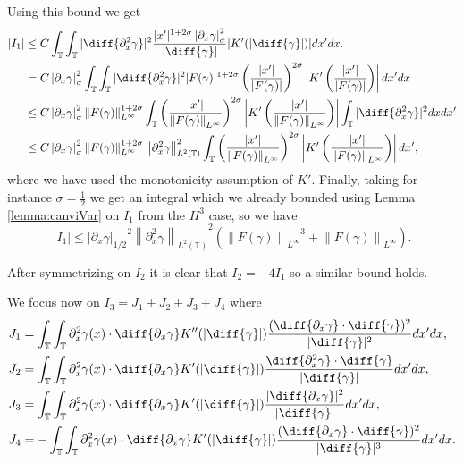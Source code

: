 \documentclass[a4paper]{amsart}
\theoremstyle{definition}
\newcommand{\T}{\ensuremath{\mathbb{T}}}
\newcommand{\SNa}[2][\gamma]{\ensuremath{\left|#2\right|_{#1}}}
\newcommand{\Np}[2][\infty]{\ensuremath{\left\|#2\right\|_{L^#1}}}
\newcommand{\Lp}[2][2]{\ensuremath{\left\|#2\right\|_{L^#1(\T)}}}
\newcommand{\intTT}{\ensuremath{\int_\T\int_\T}}
\begin{document}
    Using this bound we get 
    \begin{align*}
        |I_1|&\leq C \intTT |\diff{\partial_x^2\gamma}|^2 \frac{|x'|^{1+2\sigma} \SNa[\sigma]{\partial_ x \gamma }^2}{|\diff{\gamma}|} |K'(|\diff{\gamma}|)| dx'dx.
        \\
        &= C \SNa[\sigma]{\partial_ x \gamma }^2 \intTT |\diff{\partial_x^2\gamma}|^2 |F(\gamma)|^{1+2\sigma}\left(\frac{|x'|}{|F(\gamma)|}\right)^{2\sigma} \left|K'\left(\frac{|x'|}{|F(\gamma)|}\right)\right| dx'dx \\
        &\leq  C \SNa[\sigma]{\partial_ x \gamma }^2 \Np{F(\gamma)}^{1+2\sigma} \int_\T\left(\frac{|x'|}{\Np{F(\gamma)}}\right)^{2\sigma} \left| K'\left(\frac{|x'|}{\Np{F(\gamma)}}\right) \right| \int_\T |\diff{\partial_x^2\gamma}|^2  dxdx'\\
        &\leq C \SNa[\sigma]{\partial_ x \gamma }^2 \Np{F(\gamma)}^{1+2\sigma}  \Lp{\partial_x^2 \gamma}^2 \int_\T\left(\frac{|x'|}{\Np{F(\gamma)}}\right)^{2\sigma} \left| K'\left(\frac{|x'|}{\Np{F(\gamma)}}\right) \right| dx',
    \end{align*}
     where we have used the monotonicity assumption of $K'$. Finally, taking for instance $\sigma=\frac{1}{2}$ we get an integral which we already bounded using Lemma \ref{lemma:canviVar} on $I_1$ from the $H^3$ case, so we have
     $$|I_1|\leq \SNa[1/2]{\partial_x\gamma}^2 \Lp{\partial_x^2\gamma}^2 (\Np{F(\gamma)}^3+\Np{F(\gamma)}). $$
         
    After symmetrizing on $I_2$ it is clear that $I_2=-4I_1$ so a similar bound holds. 
    
    We focus now on $I_3=J_1+J_2+J_3+J_4$ where
     \begin{align*}
            J_1&=\intTT\partial_x^2\gamma(x)\cdot \diff{\partial_x \gamma}K''(|\diff{\gamma}|) \frac{(\diff{\partial_x\gamma}\cdot\diff{\gamma})^2}{|\diff{\gamma}|^2}dx'dx,\\
            J_2&=\intTT \partial_ x^2\gamma(x) \cdot \diff{\partial_x\gamma}K'(|\diff{\gamma}|)\frac{\diff{\partial_x^2 \gamma}\cdot\diff{\gamma}}{|\diff{\gamma}|}dx'dx,\\
            J_3&=\intTT \partial_ x^2\gamma(x) \cdot \diff{\partial_x \gamma} K'(|\diff{\gamma}|)\frac{|\diff{\partial_x\gamma}|^2}{|\diff{\gamma}|}dx'dx,\\
            J_4&=-\intTT \partial_ x^2\gamma(x) \cdot \diff{\partial_x \gamma}K'(|\diff{\gamma}|)\frac{(\diff{\partial_x\gamma}\cdot\diff{\gamma})^2}{|\diff{\gamma}|^3}dx'dx.
        \end{align*}
\end{document}
